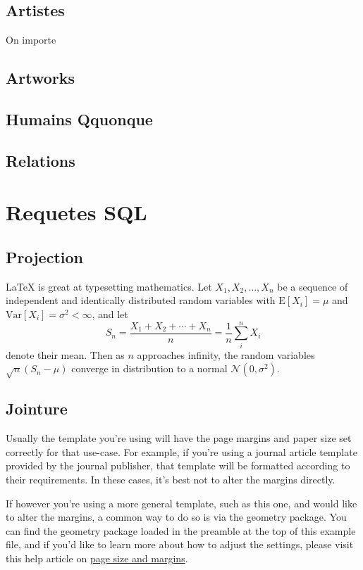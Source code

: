 \documentclass{article}
\begin{document}
\subsection{Artistes}

On importe
\hyperref[]{}{}

\subsection{Artworks}
\subsection{Humains Qquonque}
\subsection{Relations}


\section{Requetes SQL}

\subsection{Projection}

\LaTeX{} is great at typesetting mathematics. Let $X_1, X_2, \ldots, X_n$ be a sequence of independent and identically distributed random variables with $\text{E}[X_i] = \mu$ and $\text{Var}[X_i] = \sigma^2 < \infty$, and let
\[S_n = \frac{X_1 + X_2 + \cdots + X_n}{n}
      = \frac{1}{n}\sum_{i}^{n} X_i\]
denote their mean. Then as $n$ approaches infinity, the random variables $\sqrt{n}(S_n - \mu)$ converge in distribution to a normal $\mathcal{N}(0, \sigma^2)$.


\subsection{Jointure}

Usually the template you're using will have the page margins and paper size set correctly for that use-case. For example, if you're using a journal article template provided by the journal publisher, that template will be formatted according to their requirements. In these cases, it's best not to alter the margins directly.

If however you're using a more general template, such as this one, and would like to alter the margins, a common way to do so is via the geometry package. You can find the geometry package loaded in the preamble at the top of this example file, and if you'd like to learn more about how to adjust the settings, please visit this help article on \href{https://www.overleaf.com/learn/latex/page_size_and_margins}{page size and margins}.
\end{document}
